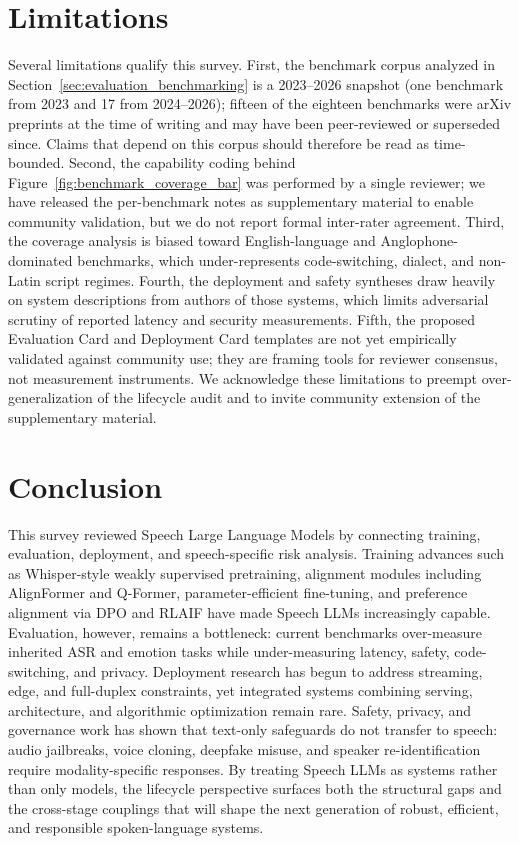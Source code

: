 \section{Limitations}
\label{sec:limitations}

Several limitations qualify this survey. First, the benchmark corpus
analyzed in Section~\ref{sec:evaluation_benchmarking} is a 2023--2026
snapshot (one benchmark from 2023 and 17 from 2024--2026); fifteen of
the eighteen benchmarks were arXiv preprints at the time of writing
and may have been peer-reviewed or superseded since. Claims that
depend on this corpus should therefore be read as time-bounded.
Second, the capability coding behind Figure~\ref{fig:benchmark_coverage_bar} was
performed by a single reviewer; we have released the per-benchmark
notes as supplementary material to enable community validation, but we
do not report formal inter-rater agreement. Third, the coverage
analysis is biased toward English-language and Anglophone-dominated
benchmarks, which under-represents code-switching, dialect, and
non-Latin script regimes. Fourth, the deployment and safety syntheses
draw heavily on system descriptions from authors of those systems,
which limits adversarial scrutiny of reported latency and security
measurements. Fifth, the proposed Evaluation Card and Deployment Card
templates are not yet empirically validated against community use;
they are framing tools for reviewer consensus, not measurement
instruments. We acknowledge these limitations to preempt
over-generalization of the lifecycle audit and to invite community
extension of the supplementary material.

\section{Conclusion}
\label{sec:conclusion}

This survey reviewed Speech Large Language Models by connecting training,
evaluation, deployment, and speech-specific risk analysis. Training
advances such as Whisper-style weakly supervised pretraining, alignment
modules including AlignFormer and Q-Former,
parameter-efficient fine-tuning, and preference alignment via DPO and
RLAIF have made Speech LLMs increasingly capable. Evaluation, however,
remains a bottleneck: current benchmarks over-measure inherited ASR and
emotion tasks while under-measuring latency, safety, code-switching, and
privacy. Deployment research has begun to address streaming, edge, and
full-duplex constraints, yet
integrated systems combining serving, architecture, and algorithmic
optimization remain rare. Safety, privacy, and governance work has shown
that text-only safeguards do not transfer to speech: audio jailbreaks,
voice cloning, deepfake misuse, and speaker re-identification require
modality-specific responses. By treating Speech LLMs as systems rather
than only models, the lifecycle perspective surfaces both the structural
gaps and the cross-stage couplings that will shape the next generation
of robust, efficient, and responsible spoken-language systems.
